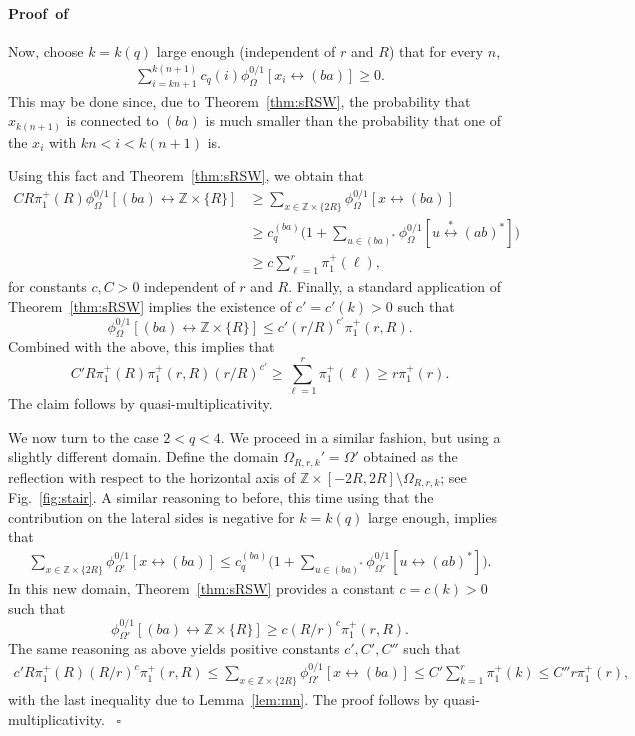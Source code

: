 \documentclass[a4paper,oneside,11pt]{article}
\numberwithin{equation}{section}
\numberwithin{equation}{section}
\numberwithin{equation}{section}
\newenvironment{proof}[1][\relax]%
  {\paragraph{Proof\ifx#1\relax\else~of #1\fi}}%
  {~\hfill$\square$\par\bigskip}
\newcommand{\bbZ}{\mathbb{Z}}
\begin{document}
\begin{proof}
Now, choose $k=k(q)$ large enough (independent of $r$ and $R$) that for every $n$,
\begin{align*}
	\sum_{i=kn+1}^{k(n+1)}c_q(i)\phi_{\Omega}^{0/1}[x_i\leftrightarrow (ba)]
	\ge 0.
\end{align*}
This may be done since, due to Theorem~\ref{thm:sRSW}, 
the probability that $x_{k(n+1)}$ is connected to $(ba)$ is much smaller than the probability that one of the $x_i$ with $kn<i<k(n+1)$ is.

Using this fact and Theorem~\ref{thm:sRSW}, we obtain that
\begin{align*}
	CR\pi_1^+(R) \phi_{\Omega}^{0/1}[(ba)\longleftrightarrow \bbZ\times\{R\}]
	&\ge  \sum_{x\in\bbZ\times\{2R\}}\phi_{\Omega}^{0/1}[x\longleftrightarrow (ba)]\\
	&\ge c_q^{(ba)}\Big(1+\!\!\!\sum_{u\in (ba)^*}\phi_{\Omega}^{0/1}[u\stackrel{*}\longleftrightarrow (ab)^*]\Big)\\
	&\ge c \sum_{\ell=1}^r\pi_1^+(\ell),
\end{align*}
for constants $c,C >0$ independent of $r$ and $R$. 
Finally, a standard application of Theorem~\ref{thm:sRSW} implies the existence of $c' = c'(k)>0$ such that 
\[
\phi_{\Omega}^{0/1}[(ba)\leftrightarrow \bbZ\times\{R\}]\le c'(r/R)^{c'}\pi_1^+(r,R).
\]
Combined with the above, this implies that
\[
C'R\pi_1^+(R)\pi_1^+(r,R)(r/R)^{c'}\ge  \sum_{\ell=1}^r\pi_1^+(\ell)\ge r\pi_1^+(r).
\]
The claim follows by quasi-multiplicativity.
\bigbreak

We now turn to the case $2<q< 4$. 
We proceed in a similar fashion, but using a slightly different domain. 
Define the domain $\Omega_{R,r,k}'=\Omega'$ obtained as the reflection with respect to the horizontal axis of $\bbZ\times[-2R,2R]\setminus\Omega_{R,r,k}$; see Fig.~\ref{fig:stair}. 
A similar reasoning to before, this time using that the contribution on the lateral sides is negative for $k= k(q)$ large enough, implies that 
\begin{align*}
    \sum_{x\in\bbZ \times \{2R\}}\phi_{\Omega'}^{0/1}[x\longleftrightarrow (ba)]
    \le  c_q^{(ba)}\Big(1+\!\!\!\sum_{u\in (ba)^*}\phi_{\Omega'}^{0/1}[u\longleftrightarrow (ab)^*]\Big).
\end{align*}
In this new domain, Theorem~\ref{thm:sRSW} provides a constant $c = c(k) > 0$ such that 
$$ \phi_{\Omega'}^{0/1}[(ba)\leftrightarrow \bbZ\times\{R\}]\ge c(R/r)^{c}\pi_1^+(r,R).$$
The same reasoning as above yields positive constants $c', C', C''$ such that
\begin{align*}
	c'R\pi_1^+(R) (R/r)^{c}\pi_1^+(r,R)
	\le \sum_{x\in\bbZ \times \{2R\}}\phi_{\Omega'}^{0/1}[x\longleftrightarrow (ba)]
	\le C'  \sum_{k=1}^r\pi_1^+(k)
	\le C'' r\pi_1^+(r),
\end{align*}
with the last inequality due to Lemma~\ref{lem:mn}.
The proof follows by quasi-multiplicativity.
\end{proof}
\end{document}
